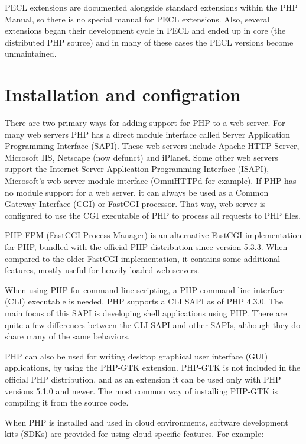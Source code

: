 PECL extensions are documented alongside standard extensions within the PHP Manual, so there is no special manual for PECL extensions. Also, several extensions began their development cycle in PECL and ended up in core (the distributed PHP source) and in many of these cases the PECL versions become unmaintained.



\chapter{Installation and configration}

There are two primary ways for adding support for PHP to a web server. For many web servers PHP has a direct module interface called Server Application Programming Interface (SAPI). These web servers include Apache HTTP Server, Microsoft IIS, Netscape (now defunct) and iPlanet. Some other web servers support the Internet Server Application Programming Interface (ISAPI), Microsoft's web server module interface (OmniHTTPd for example). If PHP has no module support for a web server, it can always be used as a Common Gateway Interface (CGI) or FastCGI processor. That way, web server is configured to use the CGI executable of PHP to process all requests to PHP files.


PHP-FPM (FastCGI Process Manager) is an alternative FastCGI implementation for PHP, bundled with the official PHP distribution since version 5.3.3. When compared to the older FastCGI implementation, it contains some additional features, mostly useful for heavily loaded web servers.

When using PHP for command-line scripting, a PHP command-line interface (CLI) executable is needed. PHP supports a CLI SAPI as of PHP 4.3.0. The main focus of this SAPI is developing shell applications using PHP. There are quite a few differences between the CLI SAPI and other SAPIs, although they do share many of the same behaviors.

PHP can also be used for writing desktop graphical user interface (GUI) applications, by using the PHP-GTK extension. PHP-GTK is not included in the official PHP distribution, and as an extension it can be used only with PHP versions 5.1.0 and newer. The most common way of installing PHP-GTK is compiling it from the source code.


When PHP is installed and used in cloud environments, software development kits (SDKs) are provided for using cloud-specific features. For example:


